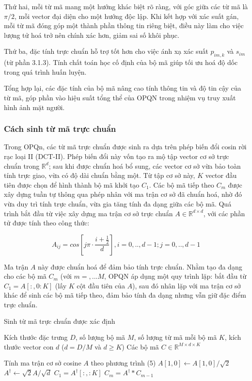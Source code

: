 Thứ hai, mỗi từ mã mang một hướng khác biệt rõ ràng, với góc giữa các từ mã là $\pi/2$, mỗi vector đại diện cho một hướng độc lập. Khi kết hợp với xác suất gán, mỗi từ mã đóng góp một thành phần thông tin riêng biệt, điều này làm cho việc lượng tử hoá trở nên chính xác hơn, giảm sai số khôi phục.

Thứ ba, đặc tính trực chuẩn hỗ trợ tốt hơn cho việc ánh xạ xác suất $p_{im,k}$ và $s_{im}$ (từ phần 3.1.3). Tính chất toán học cố định của bộ mã giúp tối ưu hoá độ dốc trong quá trình huấn luyện.

Tổng hợp lại, các đặc tính của bộ mã nâng cao tính thông tin và độ tin cậy của từ mã, góp phần vào hiệu suất tổng thể của OPQN trong nhiệm vụ truy xuất hình ảnh mặt người.

\subsubsection{Cách sinh từ mã trực chuẩn} 
Trong OPQn, các từ mã trực chuẩn được sinh ra dựa trên phép biến đổi cosin rời rạc loại II (DCT-II). Phép biến đổi này vốn tạo ra mộ tập vector cơ sở trực chuẩn trong $\mathbb{R}^d$; sau khi được chuẩn hoá bổ sung, các vector cơ sở vừa bảo toàn tính trực giao, vừa có độ dài chuẩn bằng một. Từ tập cơ sở này, $K$ vector đầu tiên được chọn để hình thành bộ mã khởi tạo $C_1$. Các bộ mã tiếp theo $C_m$ được xây dựng tuần tự thông qua phép nhân với ma trận cơ sở đã chuẩn hoá, nhờ đó vừa duy trì tính trực chuẩn, vừa gia tăng tính đa dạng giữa các bộ mã. Quá trình bắt đầu từ việc xây dựng ma trận cơ sở trực chuẩn $A \in \mathbb{R}^{d \times d}$, với các phần tử được tính theo công thức: 

\begin{equation}
A_{ij} = cos[j\pi \cdot \frac{i + \frac{1}{2}}{d}], i = 0, ..,d-1; j =  0,.., d-1
\end{equation}


Ma trận $A$ này được chuẩn hoá để đảm bảo tính trực chuẩn. Nhằm tạo đa dạng cho các bộ mã $C_m$ (với $m =  ,...M$, OPQN áp dụng một quy trình lặp: bắt đầu từ $C_1 = A[:,0 : K]$ (lấy $K$ cột đầu tiên của $A$), sau đó nhân lặp với ma trận cơ sở khác để sinh các bộ mã tiếp theo, đảm bảo tính đa dạng nhưng vẫn giữ đặc điểm trực chuẩn.

\begin{algorithm}
\caption{Sinh từ mã trực chuẩn được xác định }
\begin{algorithmic}[1]
\Require Kích thước đặc trưng $D$, số lượng bộ mã $M$, số lượng từ mã mỗi bộ mã $K$, kích thước vector con $d$ ($d = D/M$ và $d \geq K$)
\Ensure Các bộ mã $C \in \mathbb{R}^{M \times d \times K}$

\State Tính ma trận cơ sở cosine $A$ theo phương trình (5)
\State $A[1,0] \leftarrow A[1,0]/\sqrt{2}$
\State $A^\dagger \leftarrow \sqrt{2}A / \sqrt{d}$
\State $C_1 = A^\dagger[:, :K]$
    \State $C_m = A^ \dagger  * C_{m-1}$
\EndFor
\end{algorithmic}
\end{algorithm}

